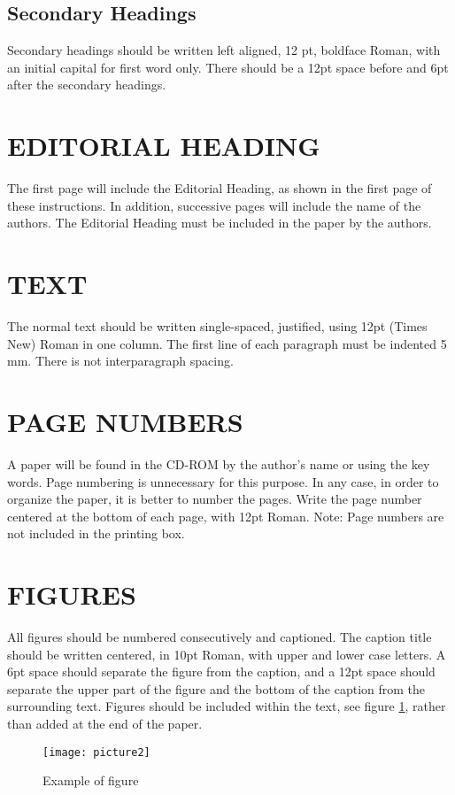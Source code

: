 \documentclass{CFD2010paper}
\begin{document}
\subsection{Secondary Headings}
Secondary headings should be written left aligned, 12 pt, boldface Roman, with an initial capital for first word only. There should be a 12pt space before and 6pt after the secondary headings.

\section{EDITORIAL HEADING}
The first page will include the Editorial Heading, as shown in the first page of these instructions. In addition, successive pages will include the name of the authors. The Editorial Heading must be included in the paper by the authors.

\section{TEXT}
The normal text should be written single-spaced, justified, using 12pt (Times New) Roman in one column. The first line of each paragraph must be indented 5 mm. There is not interparagraph spacing.

\section{PAGE NUMBERS}
A paper will be found in the CD-ROM by the author's name or using the key words. Page numbering is unnecessary for this purpose. In any case, in order to organize the paper, it is better to number the pages. Write the page number centered at the bottom of each page, with 12pt Roman. Note: Page numbers are not included in the printing box.

\section{FIGURES}
All figures should be numbered consecutively and captioned. The caption title should be written centered, in 10pt Roman, with upper and lower case letters.
A 6pt space should separate the figure from the caption, and a 12pt space should separate the upper part of the figure and the bottom of the caption from the surrounding text.
Figures should be included within the text, see figure \ref{figexample}, rather than added at the end of the paper.
%
\begin{figure}[ht]
\centering
\texttt{[image: picture2]}
\vskip-0.2cm
\caption{Example of figure}
\label{figexample}
\end{figure}
\end{document}
